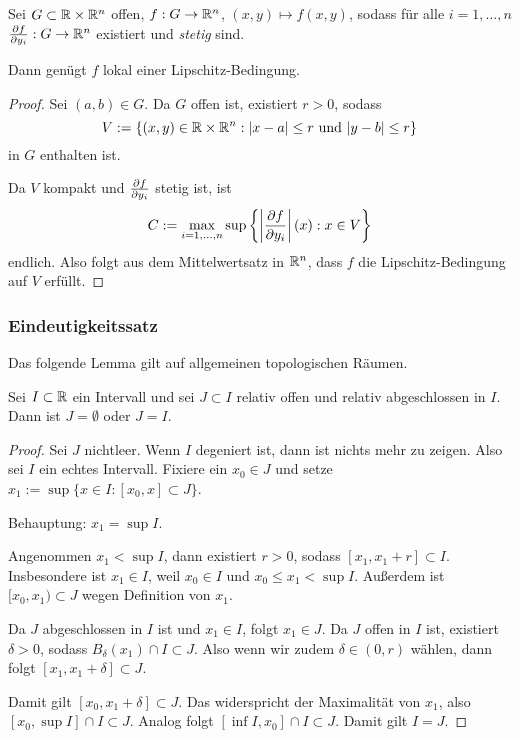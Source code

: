 \begin{thm}
  Sei $G \subset \mathbb{R} \times \mathbb{R}^n$ offen, $f:G \to \mathbb{R}^n$, $(x,y) \mapsto
  f(x,y)$, sodass für alle $i = 1, \ldots, n$ $\frac{\partial f}{\partial y_i}:G \to \mathbb{R}^n$
  existiert und \emph{stetig} sind.

  Dann genügt $f$ lokal einer Lipschitz-Bedingung.
\end{thm}

\begin{proof}
  Sei $(a,b) \in G$. Da $G$ offen ist, existiert $r > 0$, sodass
  \[ V:= \{ (x,y) \in \mathbb{R} \times \mathbb{R}^n:|x-a| \le r \text{ und } |y-b| \le r
    \} \]
  in $G$ enthalten ist.

  Da $V$ kompakt und $\frac{\partial f}{\partial y_i}$ stetig ist, ist
  \[ C := \max_{i=1, \ldots, n} \sup \left\{ \left| \frac{\partial f}{\partial y_i} \right|(x) :
      x \in V \right\} \]
  endlich. Also folgt aus dem Mittelwertsatz in $\mathbb{R}^n$, dass $f$ die
  Lipschitz-Bedingung auf $V$ erfüllt.
\end{proof}

\subsubsection{Eindeutigkeitssatz}
Das folgende Lemma gilt auf allgemeinen topologischen Räumen.

\begin{lem}
  Sei $I \subset \mathbb{R}$ ein Intervall und sei $J \subset I$ relativ offen und
  relativ abgeschlossen in $I$. Dann ist $J = \emptyset$ oder $J = I$.
\end{lem}

\begin{proof}
  Sei $J$ nichtleer. Wenn $I$ degeniert ist, dann ist nichts mehr zu zeigen.
  Also sei $I$ ein echtes Intervall. Fixiere ein $x_0 \in J$ und setze $x_1 :=
  \sup \{ x \in I : [x_0, x] \subset J \}$.

  Behauptung: $x_1 = \sup I$.

  Angenommen $x_1 < \sup I$, dann existiert $r > 0$, sodass $[x_1, x_1 + r]
  \subset I$. Insbesondere ist $x_1 \in I$, weil $x_0 \in I$ und $x_0 \le x_1 <
  \sup I$. Außerdem ist $[x_0,x_1) \subset J$ wegen Definition von $x_1$.

  Da $J$ abgeschlossen in $I$ ist und $x_1 \in I$, folgt $x_1 \in J$. Da $J$
  offen in $I$ ist, existiert $\delta > 0$, sodass $B_\delta(x_1) \cap I \subset
  J$. Also wenn wir zudem $\delta \in (0,r)$ wählen, dann folgt
  $[x_1,x_1+\delta] \subset J$.

  Damit gilt $[x_0,x_1+\delta] \subset J$. Das widerspricht der Maximalität von
  $x_1$, also $[x_0, \sup I ] \cap I \subset J$. Analog folgt $[\inf I, x_0]
  \cap I \subset J$. Damit gilt $I = J$.
\end{proof}

